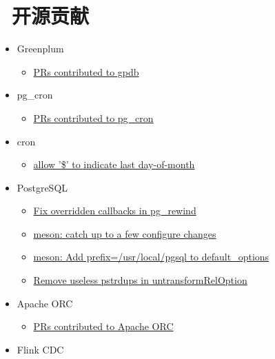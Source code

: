 \documentclass{resume}
\begin{document}
\section{\faCodeFork\ 开源贡献}
\begin{onehalfspacing}
  \begin{itemize}
    \item Greenplum
      \begin{itemize}
        \item \href{hhttps://github.com/greenplum-db/gpdb/pulls?q=is%3Apr+author%3A%40me+}{PRs contributed to gpdb}
      \end{itemize}
    \item pg\_cron
      \begin{itemize}
        \item \href{https://github.com/citusdata/pg_cron/pulls?q=is%3Apr+author%3A%40me+}{PRs contributed to pg\_cron}
      \end{itemize}
    \item cron
      \begin{itemize}
        \item \href{https://github.com/vixie/cron/pull/20}{allow '\$' to indicate last day-of-month}
      \end{itemize}
    \item PostgreSQL
      \begin{itemize}
        \item \href{https://github.com/postgres/postgres/commit/08237056f}{Fix overridden callbacks in pg\_rewind}
        \item \href{https://github.com/postgres/postgres/commit/57bab33302}{meson: catch up to a few configure changes}
        \item \href{https://github.com/postgres/postgres/commit/1360943d1a}{meson: Add prefix=/usr/local/pgsql to default\_options}
        \item \href{https://github.com/postgres/postgres/commit/6710e83a67}{Remove useless pstrdups in untransformRelOption}
      \end{itemize}
    \item Apache ORC
      \begin{itemize}
        \item \href{https://github.com/apache/orc/pulls?q=is%3Apr+author%3A%40me+}{PRs contributed to Apache ORC}
      \end{itemize}
    \item Flink CDC
      \begin{itemize}

\end{itemize}
\end{itemize}
\end{onehalfspacing}
\end{document}
